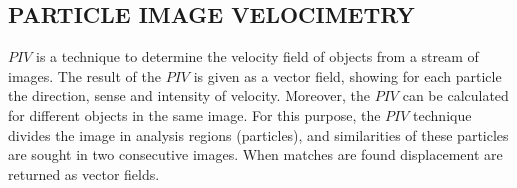 
\subsection{PARTICLE IMAGE VELOCIMETRY}

$PIV$ is a technique to determine the  velocity field of objects from a stream of images\cite{Bastiaans}.
The result of the $PIV$ is given as a vector field, showing for each particle the direction, sense and intensity of velocity. 
Moreover, the $PIV$ can be calculated for different objects in the same image.
For this purpose, the $PIV$ technique divides the image in analysis regions (particles), 
and similarities of these particles are sought in two consecutive images.
When matches are found displacement are returned as vector fields.